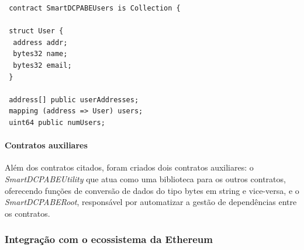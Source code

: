 \documentclass[a4paper,11pt]{article}
\begin{document}

\begin{lstlisting}
 contract SmartDCPABEUsers is Collection {

 struct User {
  address addr;
  bytes32 name;
  bytes32 email;
 }

 address[] public userAddresses;
 mapping (address => User) users;
 uint64 public numUsers;
\end{lstlisting}



\paragraph{Contratos auxiliares}

Além dos contratos citados, foram criados dois contratos auxiliares: o \emph{SmartDCPABEUtility} que atua como uma biblioteca para os outros contratos, oferecendo funções de conversão de dados do tipo bytes em string e vice-versa, e o \emph{SmartDCPABERoot}, responsável por automatizar a gestão de dependências entre os contratos. %

\subsubsection{Integração com o ecossistema da Ethereum}


\end{document}
